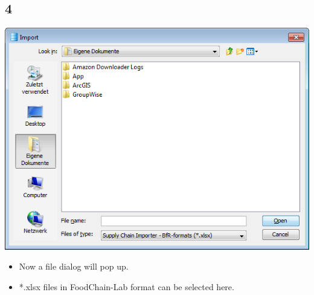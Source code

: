 \documentclass{beamer}
\begin{document}
\subsection{4}
\begin{frame}
	\begin{center}
  		\includegraphics[height=0.6\textheight]{4.png}
	\end{center}
	\begin{itemize}
		\item Now a file dialog will pop up.
		\item *.xlsx files in FoodChain-Lab format can be selected here.
	\end{itemize}
\end{frame}
\end{document}

